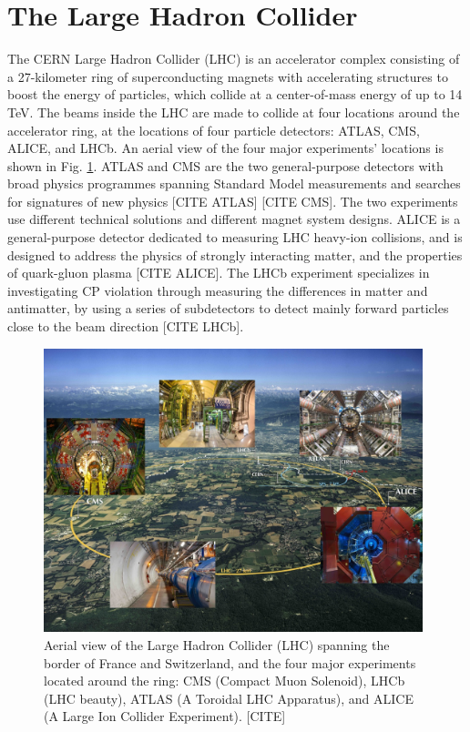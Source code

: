 \section{The Large Hadron Collider}

The CERN Large Hadron Collider (LHC) is an accelerator complex consisting of a 27-kilometer ring of superconducting magnets with accelerating structures to boost the energy of particles, which collide at a center-of-mass energy of up to 14 TeV. The beams inside the LHC are made to collide at four locations around the accelerator ring, at the locations of four particle detectors: ATLAS, CMS, ALICE, and LHCb. An aerial view of the four major experiments' locations is shown in Fig. \ref{fig:aerial-view-LHC-ring}. ATLAS and CMS are the two general-purpose detectors with broad physics programmes spanning Standard Model measurements and searches for signatures of new physics [CITE ATLAS] [CITE CMS]. The two experiments use different technical solutions and different magnet system designs. ALICE is a general-purpose detector dedicated to measuring LHC heavy-ion collisions, and is designed to address the physics of strongly interacting matter, and the properties of quark-gluon plasma [CITE ALICE]. The LHCb experiment specializes in investigating CP violation through measuring the differences in matter and antimatter, by using a series of subdetectors to detect mainly forward particles close to the beam direction [CITE LHCb]. 

\begin{figure}[ht]
    \centering
    \includegraphics[width=11cm]{figures/ch-2-cern-cms/aerial-view-LHC-ring.jpeg}
    \caption{Aerial view of the Large Hadron Collider (LHC) spanning the border of France and Switzerland, and the four major experiments located around the ring: CMS (Compact Muon Solenoid), LHCb (LHC beauty), ATLAS (A Toroidal LHC Apparatus), and ALICE (A Large Ion Collider Experiment). [CITE]}
    \label{fig:aerial-view-LHC-ring}
\end{figure}


